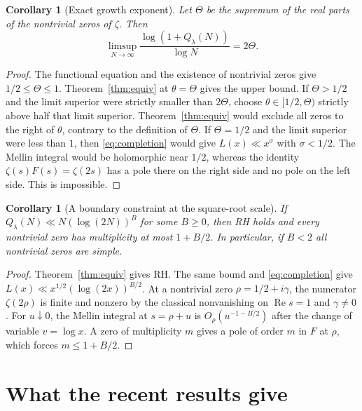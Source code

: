 \documentclass[11pt]{amsart}
\newtheorem{corollary}[theorem]{Corollary}
\theoremstyle{definition}
\theoremstyle{remark}
\newcommand{\R}{\operatorname{Re}}
\numberwithin{equation}{section}
\begin{document}
\begin{corollary}[Exact growth exponent]\label{cor:exponent}
Let \(\Theta\) be the supremum of the real parts of the nontrivial zeros of \(\zeta\). Then
\[
 \limsup_{N\to\infty}\frac{\log(1+Q_\lambda(N))}{\log N}=2\Theta .
\]
\end{corollary}
\begin{proof}
The functional equation and the existence of nontrivial zeros give \(1/2\le\Theta\le1\). Theorem~\ref{thm:equiv} at \(\theta=\Theta\) gives the upper bound. If \(\Theta>1/2\) and the limit superior were strictly smaller than \(2\Theta\), choose \(\theta\in[1/2,\Theta)\) strictly above half that limit superior. Theorem~\ref{thm:equiv} would exclude all zeros to the right of \(\theta\), contrary to the definition of \(\Theta\). If \(\Theta=1/2\) and the limit superior were less than \(1\), then \eqref{eq:completion} would give \(L(x)\ll x^\sigma\) with \(\sigma<1/2\). The Mellin integral would be holomorphic near \(1/2\), whereas the identity \(\zeta(s)F(s)=\zeta(2s)\) has a pole there on the right side and no pole on the left side. This is impossible.
\end{proof}

\begin{corollary}[A boundary constraint at the square-root scale]\label{cor:simple}
If \(Q_\lambda(N)\ll N(\log(2N))^B\) for some \(B\ge0\), then RH holds and every nontrivial zero has multiplicity at most \(1+B/2\). In particular, if \(B<2\) all nontrivial zeros are simple.
\end{corollary}
\begin{proof}
Theorem~\ref{thm:equiv} gives RH. The same bound and \eqref{eq:completion} give \(L(x)\ll x^{1/2}(\log(2x))^{B/2}\). At a nontrivial zero \(\rho=1/2+i\gamma\), the numerator \(\zeta(2\rho)\) is finite and nonzero by the classical nonvanishing on \(\R s=1\) and \(\gamma\ne0\). For \(u\downarrow0\), the Mellin integral at \(s=\rho+u\) is \(O_\rho(u^{-1-B/2})\) after the change of variable \(v=\log x\). A zero of multiplicity \(m\) gives a pole of order \(m\) in \(F\) at \(\rho\), which forces \(m\le1+B/2\).
\end{proof}









\section{What the recent results give}\label{sec:frontier}
\end{document}
